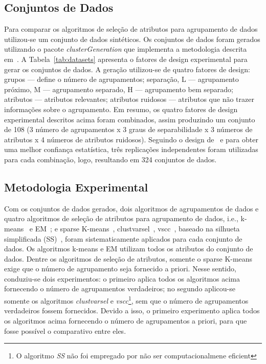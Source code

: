 \documentclass{acm_proc_article-sp}
\begin{document}
\subsection{Conjuntos de Dados}
\label{sec:datasets}
Para comparar os algoritmos de seleção de atributos para agrupamento de dados utilizou-se um conjunto de dados sintéticos.
Os conjuntos de dados foram gerados utilizando o pacote \textit{clusterGeneration} que implementa a metodologia descrita em~\cite{qiu2006generation}.
A Tabela~\ref{tab:datasets} apresenta o fatores de design experimental para gerar os conjuntos de dados.
A geração utilizou-se de quatro fatores de design: grupos --- define o número de agrupamentos; separação, L --- agrupamento próximo, M --- agrupamento separado, H --- agrupamento bem separado; atributos --- atributos relevantes; atributos ruidosos --- atributos que não trazer informações sobre o agrupamento.
Em resumo, os quatro fatores de design experimental descritos acima foram combinados, assim produzindo um conjunto de 108 (3 número de agrupamentos x 3 graus de separabilidade x 3 números de atributos x 4 números de atributos ruidosos). 
Seguindo o design de~\cite{milligan1985examination} e para obter uma melhor confiança estatística, três replicações independentes foram utilizadas para cada combinação, logo, resultando em 324 conjuntos de dados.
    
\subsection{Metodologia Experimental}
Com os conjuntos de dados gerados, dois algoritmos de agrupamentos de dados e quatro algoritmos de seleção de atributos para agrupamento de dados, i.e., k-means~\cite{hartigan1979algorithm,macqueen1967some} e EM~\cite{fraley2002model,dempster1977maximum,hastie2009elements}; e sparse K-means~\cite{witten2010framework}, clustvarsel~\cite{raftery2006variable}, vscc~\cite{andrews2013variable}, baseado na silhueta simplificada (SS)~\cite{hruschka2005feature}, foram sistematicamente aplicados para cada conjunto de dados. 
Os algoritmos k-means e EM utilizam todos os atributos do conjunto de dados.
Dentre os algoritmos de seleção de atributos, somente o sparse K-means exige que o número de agrupamento seja fornecido a priori.
Nesse sentido, conduziu-se dois experimentos: o primeiro aplica todos os algoritmos acima fornecendo o número de agrupamentos verdadeiros; no segundo aplicou-se somente os algoritmos \textit{clustvarsel} e \textit{vscc}\footnote{O algoritmo \textit{SS} não foi empregado por não ser computacionalmene eficient}, sem que o número de agrupamentos verdadeiros fossem fornecidos.
Devido a isso, o primeiro experimento aplica todos os algoritmos acima fornecendo o número de agrupamentos a priori, para que fosse possível o comparativo entre eles.
\end{document}
